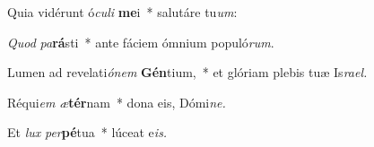 \item Quia vidérunt ó\textit{culi} \textbf{me}i~* salutáre tu\textit{um}:
\item \textit{Quod} \textit{pa}\textbf{rá}sti~* ante fáciem ómnium populó\textit{rum}.
\item Lumen ad revelati\textit{ónem} \textbf{Gén}tium,~* et glóriam plebis tuæ Is\textit{rael.}
\item Réqui\hspace*{0.03em}\textit{em} \textit{æ}\textbf{tér}nam~* dona eis, Dómi\textit{ne.}
\item Et \textit{lux} \textit{per}\textbf{pé}tua~* lúceat e\hspace*{0.03em}\textit{is.}